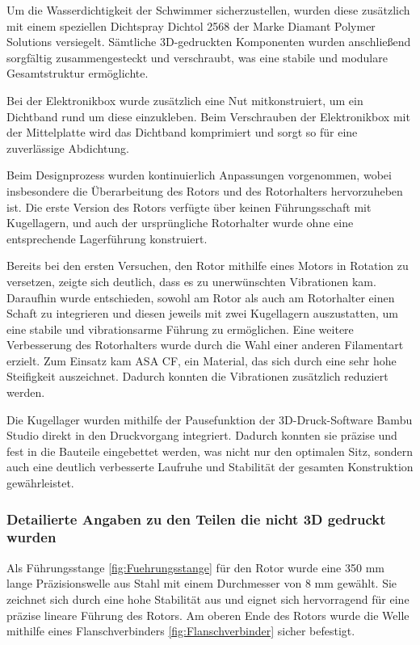 \documentclass[a4paper,12pt]{article}
\begin{document}
Um die Wasserdichtigkeit der Schwimmer sicherzustellen, wurden diese zusätzlich mit einem speziellen Dichtspray Dichtol 2568 der Marke Diamant Polymer Solutions versiegelt. Sämtliche 3D-gedruckten Komponenten wurden anschließend sorgfältig zusammengesteckt und verschraubt, was eine stabile und modulare Gesamtstruktur ermöglichte.\cite{Technisches_Datenblatt_Dichtol}\newline

Bei der Elektronikbox wurde zusätzlich eine Nut mitkonstruiert, um ein Dichtband rund um diese einzukleben. Beim Verschrauben der Elektronikbox mit der Mittelplatte wird das Dichtband komprimiert und sorgt so für eine zuverlässige Abdichtung.

Beim Designprozess wurden kontinuierlich Anpassungen vorgenommen, wobei insbesondere die Überarbeitung des Rotors und des Rotorhalters hervorzuheben ist. Die erste Version des Rotors verfügte über keinen Führungsschaft mit Kugellagern, und auch der ursprüngliche Rotorhalter wurde ohne eine entsprechende Lagerführung konstruiert.

Bereits bei den ersten Versuchen, den Rotor mithilfe eines Motors in Rotation zu versetzen, zeigte sich deutlich, dass es zu unerwünschten Vibrationen kam. Daraufhin wurde entschieden, sowohl am Rotor als auch am Rotorhalter einen Schaft zu integrieren und diesen jeweils mit zwei Kugellagern auszustatten, um eine stabile und vibrationsarme Führung zu ermöglichen. Eine weitere Verbesserung des Rotorhalters wurde durch die Wahl einer anderen Filamentart erzielt. Zum Einsatz kam ASA CF, ein Material, das sich durch eine sehr hohe Steifigkeit auszeichnet. Dadurch konnten die Vibrationen zusätzlich reduziert werden.

Die Kugellager wurden mithilfe der Pausefunktion der 3D-Druck-Software Bambu Studio direkt in den Druckvorgang integriert. Dadurch konnten sie präzise und fest in die Bauteile eingebettet werden, was nicht nur den optimalen Sitz, sondern auch eine deutlich verbesserte Laufruhe und Stabilität der gesamten Konstruktion gewährleistet.


\subsubsection{Detailierte Angaben zu den Teilen die nicht 3D gedruckt wurden}

Als Führungsstange \ref{fig:Fuehrungsstange} für den Rotor wurde eine 350 mm lange Präzisionswelle aus Stahl mit einem Durchmesser von 8 mm gewählt. Sie zeichnet sich durch eine hohe Stabilität aus und eignet sich hervorragend für eine präzise lineare Führung des Rotors. Am oberen Ende des Rotors wurde die Welle mithilfe eines Flanschverbinders \ref{fig:Flanschverbinder} sicher befestigt.
\end{document}

